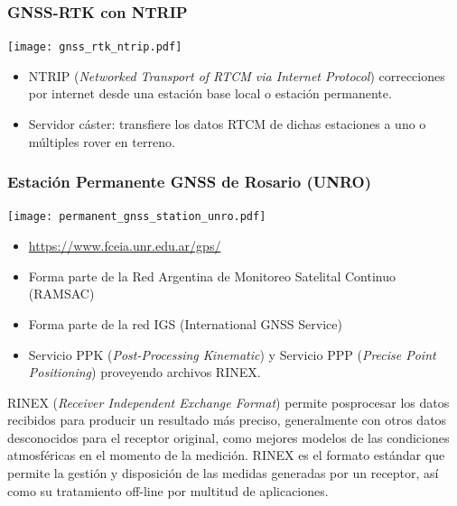 \begin{frame}
{   }
\end{frame}

\begin{frame}
    \frametitle{GNSS-RTK con NTRIP}
    \begin{center}
        \texttt{[image: gnss\_rtk\_ntrip.pdf]}
    \end{center}
    
    \begin{itemize}
        \item NTRIP (\emph{Networked Transport of RTCM via Internet Protocol}) correcciones por internet desde una estación base local o estación permanente.
        \item Servidor cáster: transfiere los datos RTCM de dichas estaciones a uno o múltiples rover en terreno.
    \end{itemize}
\end{frame}

\begin{frame}
    \frametitle{Estación Permanente GNSS de Rosario (UNRO)}
    \footnotesize
    \begin{center}
        \texttt{[image: permanent\_gnss\_station\_unro.pdf]}
    \end{center}

    \begin{itemize}
        \item \href{https://www.fceia.unr.edu.ar/gps/}{https://www.fceia.unr.edu.ar/gps/}
        \item Forma parte de la Red Argentina de Monitoreo Satelital Continuo (RAMSAC)
        \item Forma parte de la red IGS (International GNSS Service)
        \item Servicio PPK (\emph{Post-Processing Kinematic}) y Servicio PPP (\emph{Precise Point Positioning}) proveyendo archivos RINEX.
    \end{itemize}
    
    RINEX (\emph{Receiver Independent Exchange Format})  permite posprocesar los datos recibidos para producir un resultado más preciso, generalmente con otros datos desconocidos para el receptor original, como mejores modelos de las condiciones atmosféricas en el momento de la medición.
    RINEX es el formato estándar que permite la gestión y disposición de las medidas generadas por un receptor, así como su tratamiento off-line por multitud de aplicaciones.

\end{frame}


